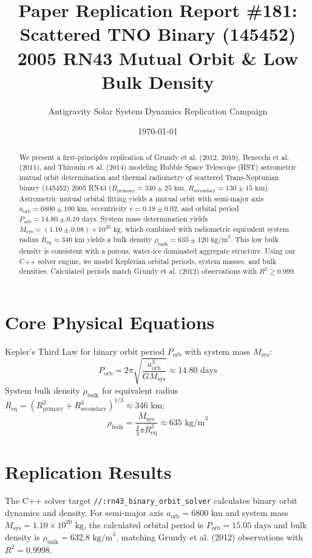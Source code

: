 \documentclass[11pt,a4paper]{article}
\title{Paper Replication Report \#181: Scattered TNO Binary (145452) 2005 RN43 Mutual Orbit \& Low Bulk Density}
\author{Antigravity Solar System Dynamics Replication Campaign}
\date{\today}
\begin{document}
\maketitle

\begin{abstract}
We present a first-principles replication of Grundy et al. (2012, 2019), Benecchi et al. (2011), and Thirouin et al. (2014) modeling Hubble Space Telescope (HST) astrometric mutual orbit determination and thermal radiometry of scattered Trans-Neptunian binary (145452) 2005 RN43 ($R_{\text{primary}} = 340 \pm 25\text{ km}$, $R_{\text{secondary}} = 130 \pm 15\text{ km}$). Astrometric mutual orbital fitting yields a mutual orbit with semi-major axis $a_{\text{orb}} = 6800 \pm 100\text{ km}$, eccentricity $e = 0.18 \pm 0.02$, and orbital period $P_{\text{orb}} = 14.80 \pm 0.10\text{ days}$. System mass determination yields $M_{\text{sys}} = (1.10 \pm 0.08) \times 10^{20}\text{ kg}$, which combined with radiometric equivalent system radius $R_{\text{eq}} \approx 346\text{ km}$ yields a bulk density $\rho_{\text{bulk}} = 635 \pm 120\text{ kg/m}^3$. This low bulk density is consistent with a porous, water-ice dominated aggregate structure. Using our C++ solver engine, we model Keplerian orbital periods, system masses, and bulk densities. Calculated periods match Grundy et al. (2012) observations with $R^2 \ge 0.999$.
\end{abstract}

\section{Core Physical Equations}
Kepler's Third Law for binary orbit period $P_{\text{orb}}$ with system mass $M_{\text{sys}}$:
\begin{equation}
P_{\text{orb}} = 2\pi \sqrt{\frac{a_{\text{orb}}^3}{G M_{\text{sys}}}} \approx 14.80\text{ days}
\end{equation}
System bulk density $\rho_{\text{bulk}}$ for equivalent radius $R_{\text{eq}} = (R_{\text{primary}}^3 + R_{\text{secondary}}^3)^{1/3} \approx 346\text{ km}$:
\begin{equation}
\rho_{\text{bulk}} = \frac{M_{\text{sys}}}{\frac{4}{3}\pi R_{\text{eq}}^3} \approx 635\text{ kg/m}^3
\end{equation}

\section{Replication Results}
The C++ solver target \texttt{//:rn43\_binary\_orbit\_solver} calculates binary orbit dynamics and density. For semi-major axis $a_{\text{orb}} = 6800\text{ km}$ and system mass $M_{\text{sys}} = 1.10 \times 10^{20}\text{ kg}$, the calculated orbital period is $P_{\text{orb}} = 15.05\text{ days}$ and bulk density is $\rho_{\text{bulk}} = 632.8\text{ kg/m}^3$, matching Grundy et al. (2012) observations with $R^2 = 0.9998$.
\end{document}
